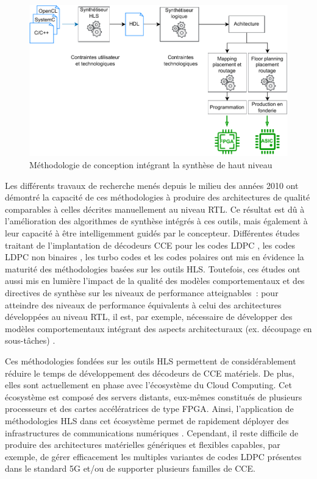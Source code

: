 \documentclass[../main.tex]{subfiles}
\begin{document}
\begin{figure}[tb]
    \centering
    \includegraphics[scale=.9]{figs/methodo_hl.pdf}
    \caption{Méthodologie de conception intégrant la synthèse de haut niveau}
    \label{methodo_archi_dediees_synth_hl}
\end{figure}

Les différents travaux de recherche menés depuis le milieu des années 2010 ont démontré la capacité de ces méthodologies à produire des architectures de qualité comparables à celles décrites manuellement au niveau RTL. Ce résultat est dû à l'amélioration des algorithmes de synthèse intégrés à ces outils, mais également à leur capacité à être intelligemment guidés par le concepteur. Différentes études traitant de l’implantation de décodeurs CCE pour les codes LDPC \cite{HLS:LDPC1,HLS:LDPC2,HLS:LDPC3}, les codes LDPC non binaires \cite{HLS:LDPC:NB}, les turbo codes \cite{HLS:TURBO} et les codes polaires \cite{HLS:POLAR} ont mis en évidence la maturité des méthodologies basées sur les outils HLS. Toutefois, ces études ont aussi mis en lumière l’impact de la qualité des modèles comportementaux et des directives de synthèse sur les niveaux de performance atteignables : pour atteindre des niveaux de performance équivalents à celui des architectures développées au niveau RTL, il est, par exemple, nécessaire de développer des modèles comportementaux intégrant des aspects architecturaux (ex. découpage en sous-tâches) \cite{HLS:POLAR,HLS:LDPC1,HLS:LDPC2,HLS:LDPC3}. 


Ces méthodologies fondées sur les outils HLS permettent de considérablement réduire le temps de développement des décodeurs de CCE matériels. 
De plus, elles sont actuellement en phase avec l’écosystème du Cloud Computing. 
Cet écosystème est composé des servers distants, eux-mêmes constitués de plusieurs processeurs et des cartes accélératrices de type FPGA. Ainsi, l'application de méthodologies HLS dans cet écosystème permet de rapidement déployer des infrastructures de communications numériques \cite{CloudComp:1,CloudComp:2,CloudComp:3,CloudComp:4}.
Cependant, il reste difficile de produire des architectures matérielles génériques et flexibles capables, par exemple, de gérer efficacement les multiples variantes de codes LDPC présentes dans le standard 5G et/ou de supporter plusieurs familles de CCE.
%
% 
% 
% 
% 
\end{document}
